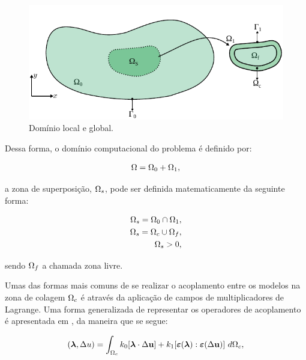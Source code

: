 \documentclass[tese_patricia]{subfiles}
\begin{document}
\begin{figure}[htb!]
	\centering 
	\includegraphics[scale=1.0,trim=0cm 0cm 0cm 0.0cm, clip=true]{Imagens/Cap6/dominioArlequin.pdf}	
	\caption{Domínio local e global.}
	\label{fig:DomLocalGlobal}
\end{figure}

Dessa forma, o domínio computacional do problema é definido por:

\begin{align}
	\Omega = \Omega_0 + \Omega_1, 
\end{align}

\noindent a zona de superposição, $\Omega_s$, pode ser definida matematicamente da seguinte forma:

\begin{align}
	\Omega_s = \Omega_0 \cap \Omega_1, \\
	\Omega_s = \Omega_c \cup \Omega_f, \\
	\Omega_s > 0, 
\end{align}

\noindent sendo  $\Omega_f$ a chamada zona livre.

Umas das formas mais comuns de se realizar o acoplamento entre os modelos na zona de colagem $\Omega_c$ é através da aplicação de campos de multiplicadores de Lagrange. Uma forma generalizada de representar os operadores de acoplamento é apresentada em , da maneira que se segue:

\begin{align}
	(\boldsymbol{\lambda},\Delta u) =  \int_{\Omega_c} k_{0}[\boldsymbol{\lambda} \cdot \Delta \mathbf{u} ] + k_{1}[\bm{\varepsilon} (\boldsymbol{\lambda}) : \bm{\varepsilon} (\Delta \mathbf{u})] \ d\Omega_{c},
\end{align}
\end{document}

